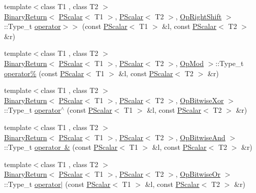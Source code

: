 \begin{DoxyCompactItemize}
{\footnotesize template$<$class T1 , class T2 $>$ }\\\mbox{\hyperlink{structENSEM_1_1BinaryReturn}{Binary\+Return}}$<$ \mbox{\hyperlink{classENSEM_1_1PScalar}{P\+Scalar}}$<$ T1 $>$, \mbox{\hyperlink{classENSEM_1_1PScalar}{P\+Scalar}}$<$ T2 $>$, \mbox{\hyperlink{structENSEM_1_1OpRightShift}{Op\+Right\+Shift}} $>$\+::Type\+\_\+t \mbox{\hyperlink{group__primscalar_ga85954268175e1f847049ff341c964518}{operator$>$$>$}} (const \mbox{\hyperlink{classENSEM_1_1PScalar}{P\+Scalar}}$<$ T1 $>$ \&l, const \mbox{\hyperlink{classENSEM_1_1PScalar}{P\+Scalar}}$<$ T2 $>$ \&r)
\item 
{\footnotesize template$<$class T1 , class T2 $>$ }\\\mbox{\hyperlink{structENSEM_1_1BinaryReturn}{Binary\+Return}}$<$ \mbox{\hyperlink{classENSEM_1_1PScalar}{P\+Scalar}}$<$ T1 $>$, \mbox{\hyperlink{classENSEM_1_1PScalar}{P\+Scalar}}$<$ T2 $>$, \mbox{\hyperlink{structENSEM_1_1OpMod}{Op\+Mod}} $>$\+::Type\+\_\+t \mbox{\hyperlink{group__primscalar_ga628b45b47db0fad40e96f41b255fe161}{operator\%}} (const \mbox{\hyperlink{classENSEM_1_1PScalar}{P\+Scalar}}$<$ T1 $>$ \&l, const \mbox{\hyperlink{classENSEM_1_1PScalar}{P\+Scalar}}$<$ T2 $>$ \&r)
\item 
{\footnotesize template$<$class T1 , class T2 $>$ }\\\mbox{\hyperlink{structENSEM_1_1BinaryReturn}{Binary\+Return}}$<$ \mbox{\hyperlink{classENSEM_1_1PScalar}{P\+Scalar}}$<$ T1 $>$, \mbox{\hyperlink{classENSEM_1_1PScalar}{P\+Scalar}}$<$ T2 $>$, \mbox{\hyperlink{structENSEM_1_1OpBitwiseXor}{Op\+Bitwise\+Xor}} $>$\+::Type\+\_\+t \mbox{\hyperlink{group__primscalar_ga86ae67deb84332c9b2cadb6d1f7149f2}{operator$^\wedge$}} (const \mbox{\hyperlink{classENSEM_1_1PScalar}{P\+Scalar}}$<$ T1 $>$ \&l, const \mbox{\hyperlink{classENSEM_1_1PScalar}{P\+Scalar}}$<$ T2 $>$ \&r)
\item 
{\footnotesize template$<$class T1 , class T2 $>$ }\\\mbox{\hyperlink{structENSEM_1_1BinaryReturn}{Binary\+Return}}$<$ \mbox{\hyperlink{classENSEM_1_1PScalar}{P\+Scalar}}$<$ T1 $>$, \mbox{\hyperlink{classENSEM_1_1PScalar}{P\+Scalar}}$<$ T2 $>$, \mbox{\hyperlink{structENSEM_1_1OpBitwiseAnd}{Op\+Bitwise\+And}} $>$\+::Type\+\_\+t \mbox{\hyperlink{group__primscalar_gadbbb42ee94a77c2df59c5a4cf78fddeb}{operator \&}} (const \mbox{\hyperlink{classENSEM_1_1PScalar}{P\+Scalar}}$<$ T1 $>$ \&l, const \mbox{\hyperlink{classENSEM_1_1PScalar}{P\+Scalar}}$<$ T2 $>$ \&r)
\item 
{\footnotesize template$<$class T1 , class T2 $>$ }\\\mbox{\hyperlink{structENSEM_1_1BinaryReturn}{Binary\+Return}}$<$ \mbox{\hyperlink{classENSEM_1_1PScalar}{P\+Scalar}}$<$ T1 $>$, \mbox{\hyperlink{classENSEM_1_1PScalar}{P\+Scalar}}$<$ T2 $>$, \mbox{\hyperlink{structENSEM_1_1OpBitwiseOr}{Op\+Bitwise\+Or}} $>$\+::Type\+\_\+t \mbox{\hyperlink{group__primscalar_ga246529f971eca0fda63267c9a68a51f7}{operator$\vert$}} (const \mbox{\hyperlink{classENSEM_1_1PScalar}{P\+Scalar}}$<$ T1 $>$ \&l, const \mbox{\hyperlink{classENSEM_1_1PScalar}{P\+Scalar}}$<$ T2 $>$ \&r)

\end{DoxyCompactItemize}
